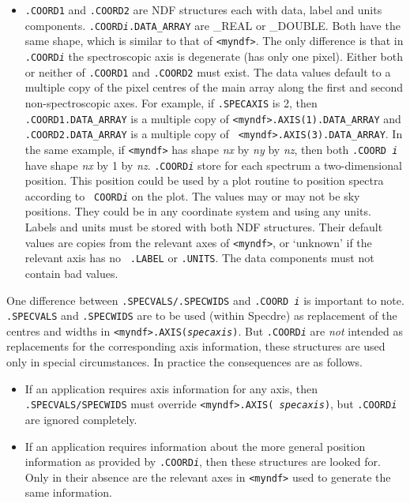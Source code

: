 \documentclass[11pt,twoside]{article}
\begin{document}
\begin{itemize}

\item{\tt .COORD1} and {\tt .COORD2} are NDF structures each with data,
   label and units components. {\tt .COORD{\it i}.DATA\_ARRAY} are \_REAL
   or \_DOUBLE. Both have the same shape, which is similar to that of
   {\tt <myndf>}. The only difference is that in {\tt .COORD{\it i}} the
   spectroscopic axis is degenerate (has only one pixel).  Either both
   or neither of {\tt .COORD1} and {\tt .COORD2} must exist.
   The data values default to a multiple copy of the pixel centres of
   the main array along the first and second non-spectroscopic axes. For
   example, if {\tt .SPECAXIS} is 2, then {\tt .COORD1.DATA\_ARRAY} is a
   multiple copy of {\tt <myndf>.AXIS(1).DATA\_ARRAY} and {\tt
   .COORD2.DATA\_ARRAY} is a multiple copy of {\tt
   <myndf>.AXIS(3).DATA\_ARRAY}. In the same example, if {\tt <myndf>}
   has shape {\it nx} by {\it ny} by {\it nz}, then both {\tt .COORD{\it
   i}} have shape {\it nx} by 1 by {\it nz}. {\tt .COORD{\it i}} store
   for each spectrum a two-dimensional position. This position could be
   used by a plot routine to position spectra according to {\tt
   COORD{\it i}} on the plot. The values may or may not be sky
   positions. They could be in any coordinate system and using any
   units. Labels and units must be stored with both NDF
   structures. Their default values are copies from the relevant axes of
   {\tt <myndf>}, or `unknown' if the relevant axis has no {\tt
   .LABEL} or {\tt .UNITS}. The data components must not contain bad
   values.

\end{itemize}

   One difference between {\tt .SPECVALS/.SPECWIDS} and {\tt .COORD{\it
   i}} is important to note. {\tt .SPECVALS} and {\tt .SPECWIDS} are to
   be used (within Specdre) as replacement of the centres and widths in
   {\tt <myndf>.AXIS({\it specaxis})}. But {\tt .COORD{\it i}} are {\em
   not\/} intended as replacements for the corresponding axis
   information, these structures are used only in special circumstances.
   In practice the consequences are as follows.

\begin{itemize}

\item If an application requires axis information for any axis, then
   {\tt .SPECVALS/SPECWIDS} must override {\tt <myndf>.AXIS({\it
   specaxis})}, but {\tt .COORD{\it i}} are ignored completely.

\item If an application requires information about the more general
   position information as provided by {\tt .COORD{\it i}}, then these
   structures are looked for. Only in their absence are the relevant
   axes in {\tt <myndf>} used to generate the same information.

\end{itemize}
\end{document}
